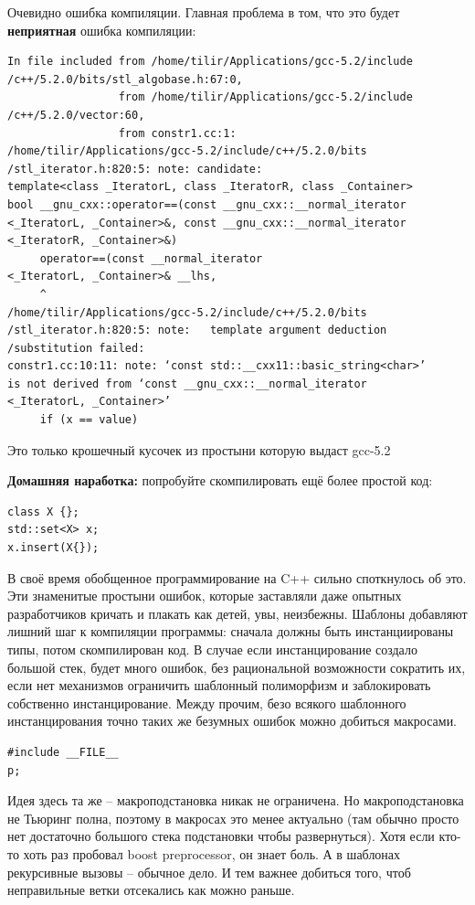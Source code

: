 \documentclass[a4paper,12pt,oneside]{article}
\newif\ifanswers
\begin{document}
Очевидно ошибка компиляции. Главная проблема в том, что это будет \textbf{неприятная} ошибка компиляции:

\begin{verbatim}
In file included from /home/tilir/Applications/gcc-5.2/include
/c++/5.2.0/bits/stl_algobase.h:67:0,
                 from /home/tilir/Applications/gcc-5.2/include
/c++/5.2.0/vector:60,
                 from constr1.cc:1:
/home/tilir/Applications/gcc-5.2/include/c++/5.2.0/bits
/stl_iterator.h:820:5: note: candidate: 
template<class _IteratorL, class _IteratorR, class _Container> 
bool __gnu_cxx::operator==(const __gnu_cxx::__normal_iterator
<_IteratorL, _Container>&, const __gnu_cxx::__normal_iterator
<_IteratorR, _Container>&)
     operator==(const __normal_iterator
<_IteratorL, _Container>& __lhs,
     ^
/home/tilir/Applications/gcc-5.2/include/c++/5.2.0/bits
/stl_iterator.h:820:5: note:   template argument deduction
/substitution failed:
constr1.cc:10:11: note: ‘const std::__cxx11::basic_string<char>’ 
is not derived from ‘const __gnu_cxx::__normal_iterator
<_IteratorL, _Container>’
     if (x == value)
\end{verbatim}

Это только крошечный кусочек из простыни которую выдаст gcc-5.2

\textbf{Домашняя наработка:} попробуйте скомпилировать ещё более простой код:

\begin{lstlisting}
class X {};
std::set<X> x;
x.insert(X{});
\end{lstlisting}

В своё время обобщенное программирование на C++ сильно споткнулось об это. Эти знаменитые простыни ошибок, которые заставляли даже опытных разработчиков кричать и плакать как детей, увы, неизбежны. Шаблоны добавляют лишний шаг к компиляции программы: сначала должны быть инстанциированы типы, потом скомпилирован код. В случае если инстанцирование создало большой стек, будет много ошибок, без рациональной возможности сократить их, если нет механизмов ограничить шаблонный полиморфизм и заблокировать собственно инстанцирование. Между прочим, безо всякого шаблонного инстанцирования точно таких же безумных ошибок можно добиться макросами.

\begin{lstlisting}
#include __FILE__
p;
\end{lstlisting}

Идея здесь та же -- макроподстановка никак не ограничена. Но макроподстановка не Тьюринг полна, поэтому в макросах это менее актуально (там обычно просто нет достаточно большого стека подстановки чтобы развернуться). Хотя если кто-то хоть раз пробовал boost preprocessor, он знает боль. А в шаблонах рекурсивные вызовы -- обычное дело. И тем важнее добиться того, чтоб неправильные ветки отсекались как можно раньше.
\end{document}
